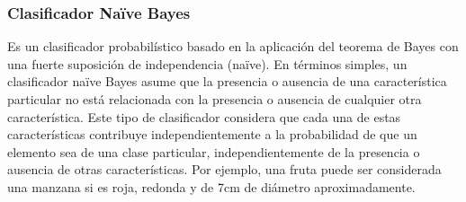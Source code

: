 \subsubsection{Clasificador Na\"{i}ve Bayes}

	Es un clasificador probabilístico basado en la aplicación del teorema de Bayes con una fuerte suposición de independencia (na\"{i}ve). En términos simples, un clasificador na\"{i}ve Bayes asume que la presencia o ausencia de una característica particular no está relacionada con la presencia o ausencia de cualquier otra característica. Este tipo de clasificador considera que cada una de estas características contribuye independientemente a la probabilidad de que un elemento sea de una clase particular, independientemente de la presencia o ausencia de otras características. Por ejemplo, una fruta puede ser considerada una manzana si es roja, redonda y de 7cm de diámetro aproximadamente.

